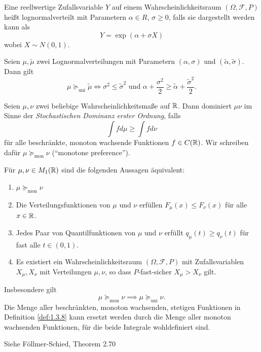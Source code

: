 \documentclass[a4paper,twoside,DIV15,BCOR12mm]{scrbook}
\newcommand{\unisucceq}{\succeq_{\text{uni}}}
\newcommand{\monsucceq}{\succeq_{\text{mon}}}
\begin{document}
\begin{definition}
Eine reellwertige Zufallsvariable $Y$ auf einem Wahrscheinlichkeitsraum $(\Omega, \mathcal F, P)$ heißt lognormalverteilt mit Parametern $\alpha\in R$, $\sigma \ge 0$, falls sie dargestellt werden kann als 
\[
Y = \exp(\alpha  + \sigma X)
\]
wobei $X \sim N(0,1)$.
\end{definition}

\begin{satz}
Seien $\mu, \tilde\mu$ zwei Lognormalverteilungen mit Parametern $(\alpha,\sigma)$ und $(\tilde\alpha,\tilde\sigma)$. Dann gilt 
\[
\mu \unisucceq \tilde\mu \iff \sigma^2 \le \tilde\sigma^2 \text{ und } \alpha + \frac{\sigma^2}2 \ge \tilde\alpha + \frac{\tilde\sigma^2}2.
\]
\end{satz}

\begin{definition}
\label{def:1.3.8}Seien $\mu,\nu$ zwei beliebige Wahrscheinlichkeitsmaße auf $\mathbb{R}$. Dann dominiert $\mu \nu$ im Sinne der \emph{Stochastischen Dominanz erster Ordnung}, falls 
\[
\int f d\mu \ge \int fd\nu
\]
für alle beschränkte, monoton wachsende Funktionen $f\in C(\mathbb{R})$. Wir schreiben dafür $\mu\monsucceq \nu$ (“monotone preference”).
\end{definition}

\begin{satz}
Für $\mu,\nu \in M_1(\mathbb{R})$ sind die folgenden Aussagen äquivalent:
\begin{enumerate}
\item $\mu\monsucceq\nu$
\item Die Verteilungsfunktionen von $\mu$ und $\nu$ erfüllen $F_\mu(x) \le F_\nu(x)$ für alle $x\in\mathbb{R}$.
\item Jedes Paar von Quantilfunktionen von $\mu$ und $\nu$ erfüllt $q_\mu(t) \ge q_\nu(t)$ für fast alle $t\in(0,1)$.
\item Es existiert ein Wahrscheinlichkeitsraum $(\Omega,\mathcal F, P)$ mit Zufallsvariablen $X_\mu, X_\nu$ mit Verteilungen $\mu, \nu$, so dass $P$-fast-sicher $X_\mu > X_\nu$ gilt.
\end{enumerate}
Insbesondere gilt \[
\mu\monsucceq\nu \implies \mu\unisucceq\nu.
\]
Die Menge aller beschränkten, monoton wachsenden, stetigen Funktionen in Definition \ref{def:1.3.8} kann ersetzt werden durch die Menge aller monoton wachsenden Funktionen, für die beide Integrale wohldefiniert sind.
\end{satz}

\begin{beweis}
Siehe Föllmer-Schied, Theorem 2.70
\end{beweis}
\end{document}
